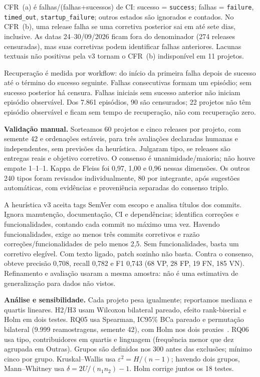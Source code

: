 CFR~(a) é falhas/(falhas+sucessos) de CI: sucesso = \texttt{success}; falhas =
\texttt{failure}, \texttt{timed\_out}, \texttt{startup\_failure}; outros estados são
ignorados e contados. No CFR~(b), uma release falha se uma corretiva posterior sai
em até sete dias, inclusive. As datas 24--30/09/2026 ficam fora do denominador
(274 releases censuradas), mas suas corretivas podem identificar falhas anteriores.
Lacunas textuais não positivas pela v3 tornam o CFR~(b) indisponível em 11 projetos.

Recuperação é medida por workflow: do início da primeira falha depois de sucesso
até o término do sucesso seguinte. Falhas consecutivas formam um episódio; sem
sucesso posterior há censura. Falhas iniciais sem sucesso anterior não iniciam
episódio observável. Dos 7.861 episódios, 90 são censurados; 22 projetos não têm
episódio observável e ficam sem tempo de recuperação, não com recuperação zero.

\textbf{Validação manual.} Sorteamos 60 projetos e cinco releases por projeto, com
semente 42 e ordenações estáveis, para três avaliações declaradas humanas e
independentes, sem previsões da heurística. Julgaram tipo, se releases são entregas
reais e objetivo corretivo. O consenso é unanimidade/maioria; não houve empate
1--1--1. Kappa de Fleiss foi 0,97, 1,00 e 0,96 nessas dimensões. Os outros 240 tipos
foram revisados individualmente, 80 por integrante, após sugestões automáticas,
com evidências e proveniência separadas do consenso triplo.

A heurística v3 aceita tags SemVer com escopo e analisa títulos dos commits.
Ignora manutenção, documentação, CI e dependências; identifica correções e
funcionalidades, contando cada commit no máximo uma vez. Havendo funcionalidades,
exige ao menos três commits corretivos e razão correções/funcionalidades de pelo
menos 2,5. Sem funcionalidades, basta um corretivo elegível. Com texto ligado,
patch sozinho não basta. Contra o consenso, obteve precisão 0,708, recall 0,782
e F1 0,743 (68 VP, 28 FP, 19 FN, 185 VN). Refinamento e avaliação usaram a mesma
amostra: não é uma estimativa de generalização para dados não vistos.

\textbf{Análise e sensibilidade.} Cada projeto pesa igualmente; reportamos mediana
e quartis lineares. H2/H3 usam Wilcoxon bilateral pareado, efeito rank-biserial e
Holm em dois testes. RQ05 usa Spearman, IC95\% BCa pareado e permutação bilateral
(9.999 reamostragens, semente 42), com Holm nos dois proxies~\cite{scipySpearman,scipyBootstrap}.
RQ06 usa tipo, contribuidores em quartis e linguagem (frequência menor que dez
agrupada em Outras). Grupos são definidos nos 300 antes das exclusões; mínimo
cinco por grupo. Kruskal--Wallis usa $\varepsilon^2=H/(n-1)$; havendo dois grupos,
Mann--Whitney usa $\delta=2U/(n_1n_2)-1$. Holm corrige juntos os 18 testes.

